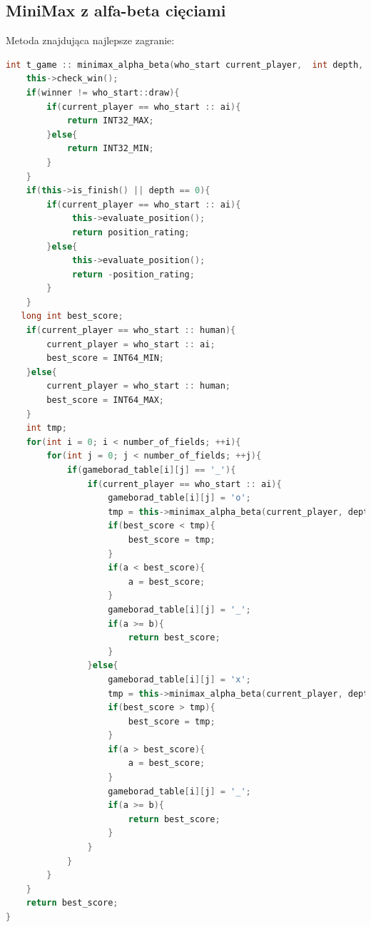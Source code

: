 \documentclass[12pt]{article}
\begin{document}
    

        \subsection{MiniMax z alfa-beta cięciami}
            Metoda znajdująca najlepsze zagranie:

            \begin{lstlisting}[language=C++, caption=minimax\_alpha\_beta()]
    int t_game :: minimax_alpha_beta(who_start current_player,  int depth, long int a, long int b){
    this->check_win();
    if(winner != who_start::draw){
        if(current_player == who_start :: ai){
            return INT32_MAX;
        }else{
            return INT32_MIN;
        }
    }
    if(this->is_finish() || depth == 0){
        if(current_player == who_start :: ai){
             this->evaluate_position();
             return position_rating;
        }else{
             this->evaluate_position();
             return -position_rating;
        }
    }
   long int best_score;
    if(current_player == who_start :: human){
        current_player = who_start :: ai;
        best_score = INT64_MIN;
    }else{
        current_player = who_start :: human;
        best_score = INT64_MAX;
    }
    int tmp;
    for(int i = 0; i < number_of_fields; ++i){
        for(int j = 0; j < number_of_fields; ++j){
            if(gameborad_table[i][j] == '_'){
                if(current_player == who_start :: ai){
                    gameborad_table[i][j] = 'o';
                    tmp = this->minimax_alpha_beta(current_player, depth-1, a, b);
                    if(best_score < tmp){
                        best_score = tmp;
                    }
                    if(a < best_score){
                        a = best_score;
                    }
                    gameborad_table[i][j] = '_';
                    if(a >= b){
                        return best_score;
                    }
                }else{
                    gameborad_table[i][j] = 'x';
                    tmp = this->minimax_alpha_beta(current_player, depth-1, a, b);
                    if(best_score > tmp){
                        best_score = tmp;
                    }
                    if(a > best_score){
                        a = best_score;
                    }
                    gameborad_table[i][j] = '_';
                    if(a >= b){
                        return best_score;
                    }
                }
            }
        } 
    }
    return best_score;
}
            \end{lstlisting}
\end{document}
